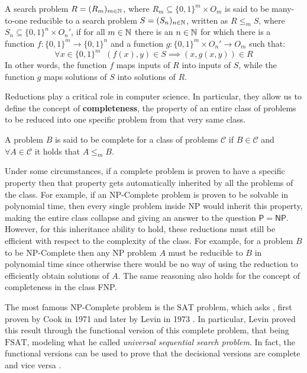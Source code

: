 \begin{definition}
 A search problem $R = (R_m)_{m \in \mathbb{N}}$, where $R_m \subseteq \{0,1\}^m \times O_m$ is said to be many-to-one reducible to a search problem $S = (S_n)_{n \in \mathbb{N}}$, written as $R \leq_m S$, where $S_n \subseteq \{0,1\}^n \times O_n'$, if for all $m \in \mathbb{N}$ there is an $n \in \mathbb{N}$ for which there is a function $f : \{0,1\}^m \to \{0,1\}^n$ and a function $g : \{0,1\}^m \times O_n' \to O_m$ such that:
    \[\forall x \in \{0,1\}^m \;\; (f(x), y) \in S \implies (x, g(x,y)) \in R\]
 In other words, the function $f$ maps inputs of $R$ into inputs of $S$, while the function $g$ maps solutions of $S$ into solutions of $R$. 
\end{definition}

\newpage

Reductions play a critical role in computer science. In particular, they allow us to define the concept of \textbf{completeness}, the property of an entire class of problems to be reduced into one specific problem from that very same class.

\begin{definition}
 A problem $B$ is said to be complete for a class of problems $\mathcal{C}$ if $B \in \mathcal{C}$ and $\forall A \in \mathcal{C}$ it holds that $A \leq_m B$.
\end{definition}

Under some circumstances, if a complete problem is proven to have a specific property then that property gets automatically inherited by all the problems of the class. For example, if an \textsf{NP}-Complete problem is proven to be solvable in polynomial time, then every single problem inside \textsf{NP} would inherit this property, making the entire class collapse and giving an answer to the question $\mathsf{P} = \mathsf{NP}$. However, for this inheritance ability to hold, these reductions must still be efficient with respect to the complexity of the class. For example, for a problem $B$ to be \textsf{NP}-Complete then any \textsf{NP} problem $A$ must be reducible to $B$ in polynomial time since otherwise there would be no way of using the reduction to efficiently obtain solutions of $A$. The same reasoning also holds for the concept of completeness in the class \textsf{FNP}.

The most famous \textsf{NP}-Complete problem is the $\mathrm{SAT}$ problem, which asks , first proven by Cook in 1971 \cite{cook_sat} and later by Levin in 1973 \cite{levin_fsat}. In particular, Levin proved this result through the functional version of this complete problem, that being $\mathrm{FSAT}$, modeling what he called \textit{universal sequential search problem}. In fact, the functional versions can be used to prove that the decisional versions are complete and vice versa \cite{rel_comp_np_search}.

